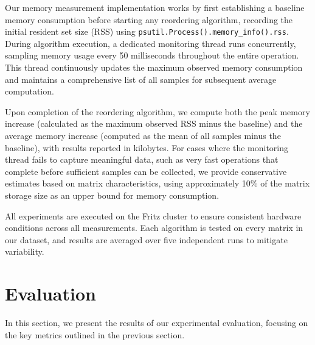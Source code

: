 Our memory measurement implementation works by first establishing a baseline memory consumption before starting any reordering algorithm, recording the initial resident set size (RSS) using \texttt{psutil.Process().memory\_info().rss}. During algorithm execution, a dedicated monitoring thread runs concurrently, sampling memory usage every 50 milliseconds throughout the entire operation. This thread continuously updates the maximum observed memory consumption and maintains a comprehensive list of all samples for subsequent average computation.

Upon completion of the reordering algorithm, we compute both the peak memory increase (calculated as the maximum observed RSS minus the baseline) and the average memory increase (computed as the mean of all samples minus the baseline), with results reported in kilobytes. For cases where the monitoring thread fails to capture meaningful data, such as very fast operations that complete before sufficient samples can be collected, we provide conservative estimates based on matrix characteristics, using approximately 10\% of the matrix storage size as an upper bound for memory consumption.

All experiments are executed on the Fritz cluster to ensure consistent hardware conditions across all measurements. Each algorithm is tested on every matrix in our dataset, and results are averaged over five independent runs to mitigate variability. 

\section{Evaluation}

In this section, we present the results of our experimental evaluation, focusing on the key metrics outlined in the previous section. 



